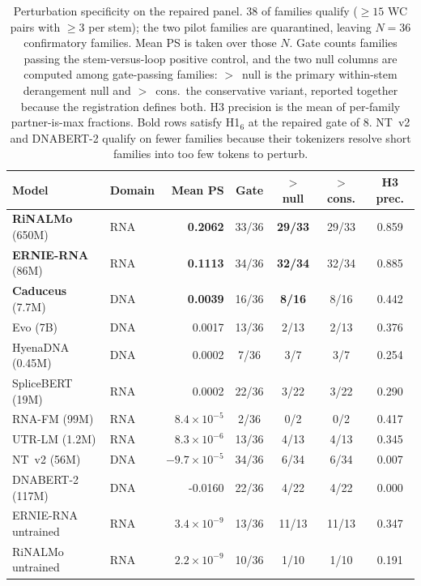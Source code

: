 \begin{table}[htbp]
\centering
\caption{Perturbation specificity on the repaired panel. 38 of \panelN{} families qualify ($\geq 15$ WC pairs with $\geq 3$ per stem); the two pilot families are quarantined, leaving $N = 36$ confirmatory families. Mean PS is taken over those $N$. Gate counts families passing the stem-versus-loop positive control, and the two null columns are computed among gate-passing families: $>$~null is the primary within-stem derangement null and $>$~cons.\ the conservative variant, reported together because the registration defines both. H3 precision is the mean of per-family partner-is-max fractions. Bold rows satisfy H1$_6$ at the repaired gate of 8. NT~v2 and DNABERT-2 qualify on fewer families because their tokenizers resolve short families into too few tokens to perturb.}
\label{tab:rung3}
\small
\begin{tabular}{llrcccc}
\toprule
\textbf{Model} & \textbf{Domain} & \textbf{Mean PS} & \textbf{Gate} & \textbf{$>$ null} & \textbf{$>$ cons.} & \textbf{H3 prec.} \\
\midrule
\textbf{RiNALMo} (650M)      & RNA & \textbf{0.2062} & 33/36 & \textbf{29/33} & 29/33 & 0.859 \\
\textbf{ERNIE-RNA} (86M)     & RNA & \textbf{0.1113} & 34/36 & \textbf{32/34} & 32/34 & 0.885 \\
\textbf{Caduceus} (7.7M)     & DNA & \textbf{0.0039} & 16/36 & \textbf{8/16} & 8/16 & 0.442 \\
Evo (7B)                     & DNA & 0.0017 & 13/36 & 2/13 & 2/13 & 0.376 \\
HyenaDNA (0.45M)             & DNA & 0.0002 & 7/36 & 3/7 & 3/7 & 0.254 \\
SpliceBERT (19M)             & RNA & 0.0002 & 22/36 & 3/22 & 3/22 & 0.290 \\
RNA-FM (99M)                 & RNA & $8.4 \times 10^{-5}$ & 2/36 & 0/2 & 0/2 & 0.417 \\
UTR-LM (1.2M)                & RNA & $8.3 \times 10^{-6}$ & 13/36 & 4/13 & 4/13 & 0.345 \\
NT~v2 (56M)                  & DNA & $-9.7 \times 10^{-5}$ & 34/36 & 6/34 & 6/34 & 0.007 \\
DNABERT-2 (117M)             & DNA & -0.0160 & 22/36 & 4/22 & 4/22 & 0.000 \\
\midrule
ERNIE-RNA untrained          & RNA & $3.4 \times 10^{-9}$ & 13/36 & 11/13 & 11/13 & 0.347 \\
RiNALMo untrained            & RNA & $2.2 \times 10^{-9}$ & 10/36 & 1/10 & 1/10 & 0.191 \\

\end{tabular}
\end{table}
